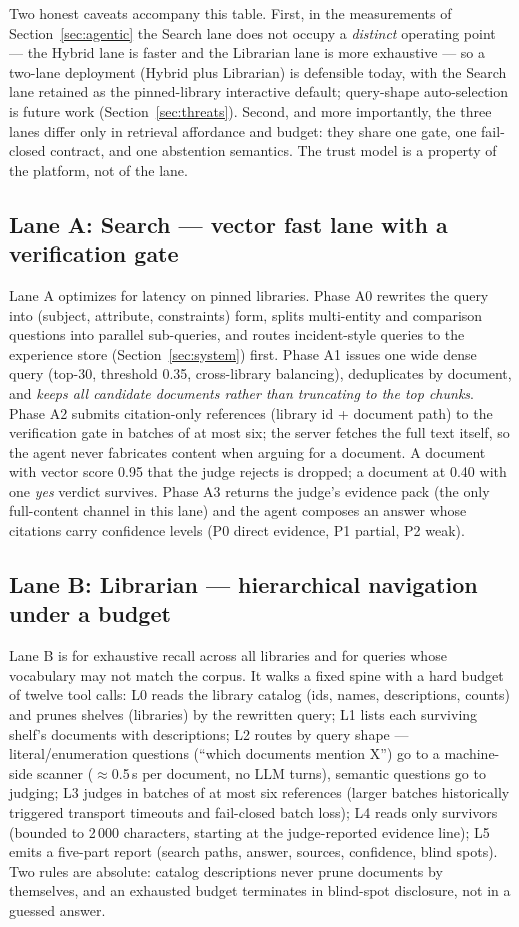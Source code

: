 Two honest caveats accompany this table. First, in the measurements of
Section~\ref{sec:agentic} the Search lane does not occupy a \emph{distinct}
operating point --- the Hybrid lane is faster and the Librarian lane is more
exhaustive --- so a two-lane deployment (Hybrid plus Librarian) is defensible
today, with the Search lane retained as the pinned-library interactive
default; query-shape auto-selection is future work
(Section~\ref{sec:threats}). Second, and more importantly, the three lanes
differ only in retrieval affordance and budget: they share one gate, one
fail-closed contract, and one abstention semantics. The trust model is a
property of the platform, not of the lane.

\subsection{Lane A: Search --- vector fast lane with a verification gate}
Lane A optimizes for latency on pinned libraries. Phase A0 rewrites the
query into (subject, attribute, constraints) form, splits multi-entity and
comparison questions into parallel sub-queries, and routes incident-style
queries to the experience store (Section~\ref{sec:system}) first. Phase A1
issues one wide dense query
(top-30, threshold 0.35, cross-library balancing), deduplicates by document,
and \emph{keeps all candidate documents rather than truncating to the top
chunks}. Phase A2 submits citation-only references (library id + document
path) to the verification gate in batches of at most six; the server fetches the
full text itself, so the agent never fabricates content when arguing for a
document. A document with vector score 0.95 that the judge rejects is
dropped; a document at 0.40 with one \emph{yes} verdict survives. Phase A3
returns the judge's evidence pack (the only full-content channel in this
lane) and the agent composes an answer whose citations carry confidence
levels (P0 direct evidence, P1 partial, P2 weak).

\subsection{Lane B: Librarian --- hierarchical navigation under a budget}
Lane B is for exhaustive recall across all libraries and for queries whose
vocabulary may not match the corpus. It walks a fixed spine with a hard
budget of twelve tool calls: L0 reads the library catalog (ids, names,
descriptions, counts) and prunes shelves (libraries) by the rewritten
query; L1 lists
each surviving shelf's documents with descriptions; L2 routes by query
shape --- literal/enumeration questions (``which documents mention X'') go
to a machine-side scanner ($\approx$0.5\,s per document, no LLM turns),
semantic questions go to judging; L3 judges in batches of at most six
references (larger batches historically triggered transport timeouts and
fail-closed batch loss); L4 reads only survivors (bounded to 2\,000
characters, starting at the judge-reported evidence line); L5 emits a
five-part report (search paths, answer, sources, confidence, blind spots).
Two rules are absolute: catalog descriptions never prune documents by
themselves, and an exhausted budget terminates in blind-spot disclosure,
not in a guessed answer.

